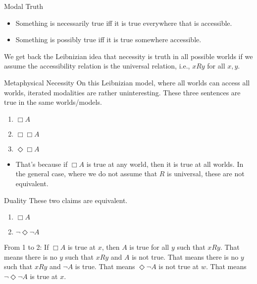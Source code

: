 \documentclass[
  14pt,
  letterpaper,
  ignorenonframetext,
  aspectratio=169,
]{beamer}
\providecommand{\tightlist}{%
  \setlength{\itemsep}{0pt}\setlength{\parskip}{0pt}}\usepackage{longtable,booktabs,array}
\begin{document}
\begin{frame}{Modal Truth}
\protect\hypertarget{modal-truth}{}
\begin{itemize}[<+->]
\tightlist
\item
  Something is necessarily true iff it is true everywhere that is
  accessible.
\item
  Something is possibly true iff it is true somewhere accessible.
\end{itemize}

We get back the Leibnizian idea that necessity is truth in all possible
worlds if we assume the accessibility relation is the universal
relation, i.e., \(xRy\) for all \(x, y\).
\end{frame}

\begin{frame}{Metaphysical Necessity}
\protect\hypertarget{metaphysical-necessity}{}
On this Leibnizian model, where all worlds can access all worlds,
iterated modalities are rather uninteresting. These three sentences are
true in the same worlds/models.

\begin{enumerate}[<+->]
\tightlist
\item
  \(\Box A\)
\item
  \(\Box \Box A\)
\item
  \(\Diamond \Box A\)
\end{enumerate}

\begin{itemize}[<+->]
\tightlist
\item
  That's because if \(\Box A\) is true at any world, then it is true at
  all worlds. In the general case, where we do not assume that \(R\) is
  universal, these are not equivalent.
\end{itemize}
\end{frame}

\begin{frame}{Duality}
\protect\hypertarget{duality}{}
These two claims are equivalent.

\begin{enumerate}[<+->]
\tightlist
\item
  \(\Box A\)
\item
  \(\neg \Diamond \neg A\)
\end{enumerate}

From 1 to 2: If \(\Box A\) is true at \(x\), then \(A\) is true for all
\(y\) such that \(xRy\). That means there is no \(y\) such that \(xRy\)
and \(A\) is not true. That means there is no \(y\) such that \(xRy\)
and \(\neg A\) is true. That means \(\Diamond \neg A\) is not true at
\(w\). That means \(\neg \Diamond \neg A\) is true at \(x\).
\end{frame}
\end{document}

